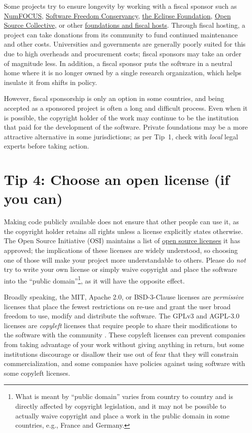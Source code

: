 \documentclass[10pt,letterpaper]{article}
\begin{document}
Some projects try to ensure longevity by working with a fiscal sponsor such as
\href{https://numfocus.org/}{NumFOCUS},
\href{https://sfconservancy.org/}{Software Freedom Conservancy},
\href{https://www.eclipse.org/}{the Eclipse Foundation},
\href{https://oscollective.org/}{Open Source Collective},
or other \href{https://sustainoss.org/academic-map/organizations/index.html}{foundations and fiscal hosts}.
Through fiscal hosting,
a project can take donations from its community to fund continued maintenance and other costs.
Universities and governments are generally poorly suited for this due to high overheads and procurement costs;
fiscal sponsors may take an order of magnitude less.
In addition,
a fiscal sponsor puts the software in a neutral home
where it is no longer owned by a single research organization,
which helps insulate it from shifts in policy.

However,
fiscal sponsorship is only an option in some countries,
and being accepted as a sponsored project is often a long and difficult process.
Even when it is possible,
the copyright holder of the work may continue to be the institution that paid for the development of the software.
Private foundations may be a more attractive alternative in some jurisdictions;
as per Tip~1,
check with \emph{local} legal experts before taking action.

\section*{Tip 4: Choose an open license (if you can)}

Making code publicly available does not ensure that other people can use it,
as the copyright holder retains all rights unless a license explicitly states otherwise.
The Open Source Initiative (OSI)
maintains a list of \href{https://opensource.org/licenses}{open source licenses} it has approved;
the implications of these licenses are widely understood,
so choosing one of those will make your project more understandable to others.
Please do \emph{not} try to write your own license or simply waive copyright and place the software into the ``public domain''\footnote{What is meant by ``public domain'' varies from country to country and is directly affected by copyright legislation, and it may not be possible to actually waive copyright and place a work in the public domain in some countries, e.g., France and Germany.},
as it will have the opposite effect.

Broadly speaking,
the MIT, Apache 2.0, or BSD-3-Clause licenses are \emph{permissive} licenses that place the fewest restrictions on re-use and grant the user broad freedom to use, modify and distribute the software. 
The GPLv3 and AGPL-3.0 licenses are \emph{copyleft} licenses
that require people to share their modifications to the software with the community \cite{Morin2012}.
These copyleft licenses can prevent companies from taking advantage of your work without giving anything in return,
but some institutions discourage or disallow their use
out of fear that they will constrain commercialization, and some companies have policies against using software with some copyleft licenses.
\end{document}

